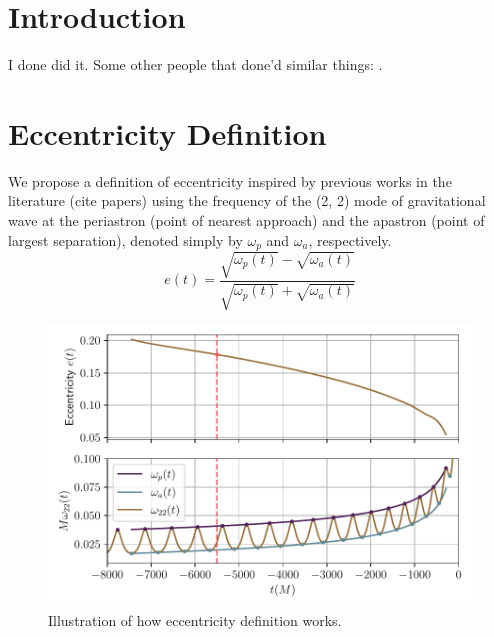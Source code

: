 \documentclass[aps,prd,amsmath,floats,floatfix, twocolumn,
superscriptaddress,nofootinbib,showpacs]{revtex4-1}
\begin{document}
\maketitle

\section{Introduction}
\label{sec:introduction}
I done did it. Some other people that done'd similar things:
\cite{Scott:2015rza}.

\section{Eccentricity Definition}
\label{sec:eccentricity_definition}
We propose a definition of eccentricity inspired by previous works in the literature (cite papers) using the frequency of the (2, 2) mode of gravitational wave at
the periastron (point of nearest approach) and the apastron (point of largest separation), denoted simply by $\omega_{p}$ and $\omega_{a}$, respectively.
\begin{equation}
\label{eq:eccentricity_definition}
e(t) = \frac{\sqrt{\omega_{p}(t)} - \sqrt{\omega_{a}(t)}}{\sqrt{\omega_{p}(t)} + \sqrt{\omega_{a}(t)}}
\end{equation}

\begin{figure}[thb]
\includegraphics[width=\columnwidth]{ecc_definition}
\caption{Illustration of how eccentricity definition works.}
\label{fig:ecc_definition}
\end{figure}
\end{document}
